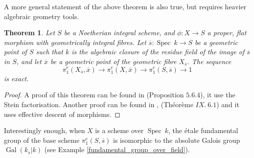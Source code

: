 \documentclass{article}
\theoremstyle{plain}
\newtheorem{theorem}{Theorem}[subsection]
\theoremstyle{definition}
\DeclareMathOperator{\Spec}{Spec}
\DeclareMathOperator{\Gal}{Gal}
\begin{document}
\noindent A more general statement of the above theorem is also true, but requires heavier algebraic geometry tools.

\begin{theorem}
    Let $S$ be a Noetherian integral scheme, and $\phi : X\rightarrow S$ a proper, flat morphism with geometrically integral fibres.
    Let $\overline{s}:\Spec\:k\rightarrow S$ be a geometric point of $S$ such that $k$ is the algebraic closure of the residue field of the image of $\overline{s}$ in $S$, and let $\overline{x}$ be a geometric point of the geometric fibre $X_{\overline{s}}$.
    The sequence 
    $$\pi^e_1(X_{\overline{s}},\overline{x})\rightarrow \pi^e_1(X,\overline{x}) \rightarrow \pi^e_1(S,\overline{s}) \rightarrow 1$$
    is exact.
\end{theorem}
\begin{proof}
    A proof of this theorem can be found in \cite{Szamuely} (Proposition $5.6.4$), it use the Stein factorisation.
    Another proof can be found in \cite{SGA}, (Th\'eor\`eme $IX.\: 6.1$) and it uses effective descent of morphisms.
\end{proof}

\noindent Interestingly enough, when $X$ is a scheme over $\Spec\:k$, the \'etale fundamental group of the base scheme $\pi^e_1(S,\overline{s})$ is isomorphic to the absolute Galois group $\Gal(k_s|k)$ (see Example \ref{fundamental_group_over_field}). 

 
\end{document}
